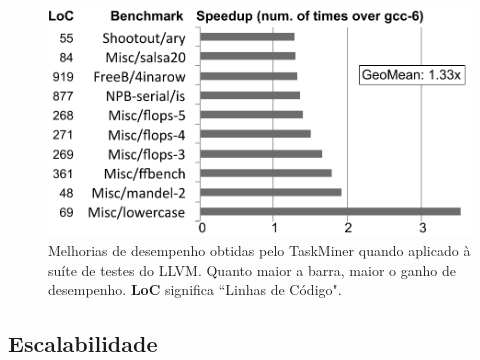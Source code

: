 \documentclass[sigplan,10pt,review]{acmart}
\newcommand\Taskminer{\mbox{\textsf{TaskMiner}}}
\begin{document}
\begin{figure}[t!]
\begin{center}
\includegraphics[width=1\columnwidth]{images/TM_GeneralProgs}
\caption{Melhorias de desempenho obtidas pelo \Taskminer{} quando aplicado à suíte de testes
do LLVM. Quanto maior a barra, maior o ganho de desempenho.
\textbf{LoC} significa ``Linhas de Código".}
\label{fig:TM_GeneralProgs}
\end{center}
\end{figure}



\subsection{Escalabilidade}
\label{sub:scalability}
\end{document}
